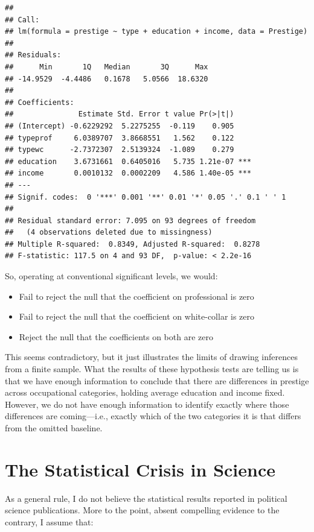 \documentclass[12pt,oneside,openany]{book}
\providecommand{\tightlist}{%
  \setlength{\itemsep}{0pt}\setlength{\parskip}{0pt}}
\begin{document}
\begin{verbatim}
## 
## Call:
## lm(formula = prestige ~ type + education + income, data = Prestige)
## 
## Residuals:
##      Min       1Q   Median       3Q      Max 
## -14.9529  -4.4486   0.1678   5.0566  18.6320 
## 
## Coefficients:
##               Estimate Std. Error t value Pr(>|t|)    
## (Intercept) -0.6229292  5.2275255  -0.119    0.905    
## typeprof     6.0389707  3.8668551   1.562    0.122    
## typewc      -2.7372307  2.5139324  -1.089    0.279    
## education    3.6731661  0.6405016   5.735 1.21e-07 ***
## income       0.0010132  0.0002209   4.586 1.40e-05 ***
## ---
## Signif. codes:  0 '***' 0.001 '**' 0.01 '*' 0.05 '.' 0.1 ' ' 1
## 
## Residual standard error: 7.095 on 93 degrees of freedom
##   (4 observations deleted due to missingness)
## Multiple R-squared:  0.8349, Adjusted R-squared:  0.8278 
## F-statistic: 117.5 on 4 and 93 DF,  p-value: < 2.2e-16
\end{verbatim}

So, operating at conventional significant levels, we would:

\begin{itemize}
\tightlist
\item
  Fail to reject the null that the coefficient on professional is zero
\item
  Fail to reject the null that the coefficient on white-collar is zero
\item
  Reject the null that the coefficients on both are zero
\end{itemize}

This seems contradictory, but it just illustrates the limits of drawing
inferences from a finite sample. What the results of these hypothesis
tests are telling us is that we have enough information to conclude that
there are differences in prestige across occupational categories,
holding average education and income fixed. However, we do not have
enough information to identify exactly where those differences are
coming---i.e., exactly which of the two categories it is that differs
from the omitted baseline.

\chapter{The Statistical Crisis in Science}\label{crisis}

As a general rule, I do not believe the statistical results reported in
political science publications. More to the point, absent compelling
evidence to the contrary, I assume that:
\end{document}
